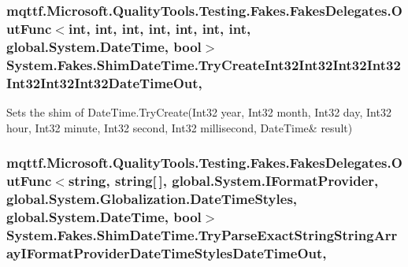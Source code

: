 \hypertarget{class_system_1_1_fakes_1_1_shim_date_time_aa4dc50ddafe6766140ef41576e00d106}{
\subsubsection[{Try\-Create\-Int32\-Int32\-Int32\-Int32\-Int32\-Int32\-Int32\-Date\-Time\-Out}]{\setlength{\rightskip}{0pt plus 5cm}mqttf.\-Microsoft.\-Quality\-Tools.\-Testing.\-Fakes.\-Fakes\-Delegates.\-Out\-Func$<$int, int, int, int, int, int, int, global.\-System.\-Date\-Time, bool$>$ System.\-Fakes.\-Shim\-Date\-Time.\-Try\-Create\-Int32\-Int32\-Int32\-Int32\-Int32\-Int32\-Int32\-Date\-Time\-Out\hspace{0.3cm}{\ttfamily [static]}, {\ttfamily [set]}}}\label{class_system_1_1_fakes_1_1_shim_date_time_aa4dc50ddafe6766140ef41576e00d106}


Sets the shim of Date\-Time.\-Try\-Create(Int32 year, Int32 month, Int32 day, Int32 hour, Int32 minute, Int32 second, Int32 millisecond, Date\-Time\& result)

\hypertarget{class_system_1_1_fakes_1_1_shim_date_time_a834eccea488add551962181e6e46ccba}{
\subsubsection[{Try\-Parse\-Exact\-String\-String\-Array\-I\-Format\-Provider\-Date\-Time\-Styles\-Date\-Time\-Out}]{\setlength{\rightskip}{0pt plus 5cm}mqttf.\-Microsoft.\-Quality\-Tools.\-Testing.\-Fakes.\-Fakes\-Delegates.\-Out\-Func$<$string, string\mbox{[}$\,$\mbox{]}, global.\-System.\-I\-Format\-Provider, global.\-System.\-Globalization.\-Date\-Time\-Styles, global.\-System.\-Date\-Time, bool$>$ System.\-Fakes.\-Shim\-Date\-Time.\-Try\-Parse\-Exact\-String\-String\-Array\-I\-Format\-Provider\-Date\-Time\-Styles\-Date\-Time\-Out\hspace{0.3cm}{\ttfamily [static]}, {\ttfamily [set]}}}\label{class_system_1_1_fakes_1_1_shim_date_time_a834eccea488add551962181e6e46ccba}


